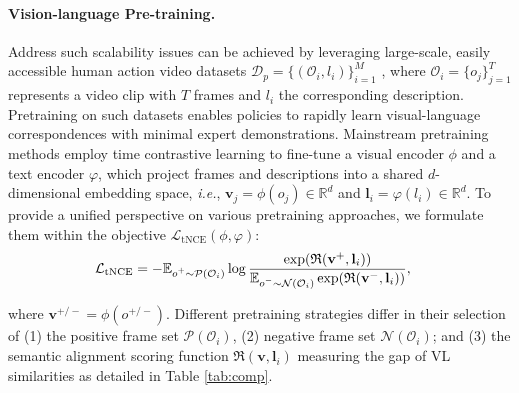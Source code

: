 \paragraph{Vision-language Pre-training.}  Address such scalability issues can be achieved by leveraging large-scale, easily accessible human action video datasets $\mathcal{D}_p = \{(\mathcal{O}_i, l_i)\}_{i=1}^M$ \cite{corr18-epickitchen,cvpr22-ego4d}, where $\mathcal{O}_i=\{o_j\}_{j=1}^T$ represents a video clip with $T$ frames and $l_i$ the corresponding description. Pretraining on such datasets enables policies to rapidly learn visual-language correspondences with minimal expert demonstrations. Mainstream pretraining methods employ time contrastive learning \cite{icra18-tcn} to fine-tune a visual encoder $\mathcal{\phi}$ and a text encoder $\mathcal{\varphi}$, which project frames and descriptions into a shared $d$-dimensional embedding space, \textit{i.e.}, $\mathbf{v}_j = \phi(o_j)\in\mathbb{R}^d$ and $\mathbf{l}_i = \varphi(l_i)\in\mathbb{R}^d$. To provide a unified perspective on various pretraining approaches, we formulate them within the objective $\mathcal{L}_{\operatorname{tNCE}}(\phi, \varphi)$: \vspace{-2ex}
\begin{align}\nonumber\small
\mathcal{L}_{\operatorname{tNCE}}&=
-\mathbb{E}_{\substack{\scriptstyle o^+\sim\textcolor{black}{\mathcal{P}(\mathcal{O}_i)}}}
    \log  
    \frac{
        \exp(\mathfrak{R}(\mathbf{v}^+, \mathbf{l}_i))
    }{
        \mathbb{E}_{\scriptstyle o^- \sim \textcolor{black}{\mathcal{N}(\mathcal{O}_i)}}
        \exp(\mathfrak{R}(\mathbf{v}^-, \mathbf{l}_i))
    },
\end{align}

where $\mathbf{v}^{+/-} = \phi(o^{+/-})$. Different pretraining strategies differ in their selection of (1) the positive frame set $\mathcal{P}(\mathcal{O}_i)$, (2) negative frame set $\mathcal{N}(\mathcal{O}_i)$; and (3) the semantic alignment scoring function $\mathfrak{R}(\mathbf{v}, \mathbf{l}_i)$ measuring the gap of VL similarities as detailed in Table \ref{tab:comp}. 

